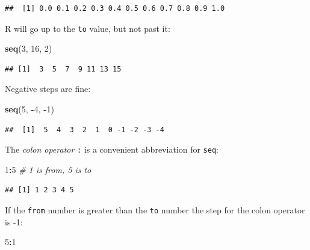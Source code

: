 \documentclass[]{book}
\makeatletter
\newenvironment{Shaded}{\begin{snugshade}}{\end{snugshade}}
\newcommand{\KeywordTok}[1]{\textcolor[rgb]{0.13,0.29,0.53}{\textbf{#1}}}
\newcommand{\DecValTok}[1]{\textcolor[rgb]{0.00,0.00,0.81}{#1}}
\newcommand{\CommentTok}[1]{\textcolor[rgb]{0.56,0.35,0.01}{\textit{#1}}}
\newcommand{\OperatorTok}[1]{\textcolor[rgb]{0.81,0.36,0.00}{\textbf{#1}}}
\newcommand{\NormalTok}[1]{#1}
\newenvironment{kframe}{%
\medskip{}
\setlength{\fboxsep}{.8em}
 \def\at@end@of@kframe{}%
 \ifinner\ifhmode%
  \def\at@end@of@kframe{\end{minipage}}%
  \begin{minipage}{\columnwidth}%
 \fi\fi%
 \def\FrameCommand##1{\hskip\@totalleftmargin \hskip-\fboxsep
 \colorbox{shadecolor}{##1}\hskip-\fboxsep
     \hskip-\linewidth \hskip-\@totalleftmargin \hskip\columnwidth}%
 \MakeFramed {\advance\hsize-\width
   \@totalleftmargin\z@ \linewidth\hsize
   \@setminipage}}%
 {\par\unskip\endMakeFramed%
 \at@end@of@kframe}
\renewenvironment{Shaded}{\begin{kframe}}{\end{kframe}}
\theoremstyle{definition}
\theoremstyle{definition}
\theoremstyle{definition}
\theoremstyle{remark}
\makeatother
\begin{document}
\begin{verbatim}
##  [1] 0.0 0.1 0.2 0.3 0.4 0.5 0.6 0.7 0.8 0.9 1.0
\end{verbatim}

R will go up to the \texttt{to} value, but not past it:

\begin{Shaded}
\begin{Highlighting}[]
\KeywordTok{seq}\NormalTok{(}\DecValTok{3}\NormalTok{, }\DecValTok{16}\NormalTok{, }\DecValTok{2}\NormalTok{)}
\end{Highlighting}
\end{Shaded}

\begin{verbatim}
## [1]  3  5  7  9 11 13 15
\end{verbatim}

Negative steps are fine:

\begin{Shaded}
\begin{Highlighting}[]
\KeywordTok{seq}\NormalTok{(}\DecValTok{5}\NormalTok{, }\OperatorTok{-}\DecValTok{4}\NormalTok{, }\OperatorTok{-}\DecValTok{1}\NormalTok{)}
\end{Highlighting}
\end{Shaded}

\begin{verbatim}
##  [1]  5  4  3  2  1  0 -1 -2 -3 -4
\end{verbatim}

The \emph{colon operator} \texttt{:} is a convenient abbreviation for
\texttt{seq}:

\begin{Shaded}
\begin{Highlighting}[]
\DecValTok{1}\OperatorTok{:}\DecValTok{5} \CommentTok{# 1 is from, 5 is to}
\end{Highlighting}
\end{Shaded}

\begin{verbatim}
## [1] 1 2 3 4 5
\end{verbatim}

If the \texttt{from} number is greater than the \texttt{to} number the
step for the colon operator is -1:

\begin{Shaded}
\begin{Highlighting}[]
\DecValTok{5}\OperatorTok{:}\DecValTok{1}
\end{Highlighting}
\end{Shaded}
\end{document}
